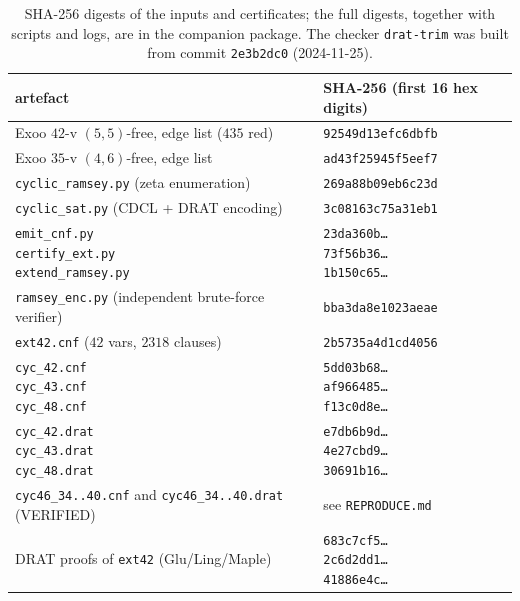 \documentclass[11pt]{article}
\theoremstyle{definition}
\theoremstyle{plain}
\begin{document}
\begin{table}[ht]
\centering\small
\begin{tabular}{ll}
\toprule
artefact & SHA-256 (first 16 hex digits) \\
\midrule
Exoo $42$-v $(5,5)$-free, edge list ($435$ red) & \texttt{92549d13efc6dbfb} \\
Exoo $35$-v $(4,6)$-free, edge list & \texttt{ad43f25945f5eef7} \\
\texttt{cyclic\_ramsey.py} (zeta enumeration) & \texttt{269a88b09eb6c23d} \\
\texttt{cyclic\_sat.py} (CDCL + DRAT encoding) & \texttt{3c08163c75a31eb1} \\
\makecell[l]{\texttt{emit\_cnf.py} \\ \texttt{certify\_ext.py} \\ \texttt{extend\_ramsey.py}} & \makecell[l]{\texttt{23da360b\ldots} \\ \texttt{73f56b36\ldots} \\ \texttt{1b150c65\ldots}} \\
\texttt{ramsey\_enc.py} (independent brute-force verifier) & \texttt{bba3da8e1023aeae} \\
\texttt{ext42.cnf} ($42$ vars, $2318$ clauses) & \texttt{2b5735a4d1cd4056} \\
\makecell[l]{\texttt{cyc\_42.cnf} \\ \texttt{cyc\_43.cnf} \\ \texttt{cyc\_48.cnf}} & \makecell[l]{\texttt{5dd03b68\ldots} \\ \texttt{af966485\ldots} \\ \texttt{f13c0d8e\ldots}} \\
\makecell[l]{\texttt{cyc\_42.drat} \\ \texttt{cyc\_43.drat} \\ \texttt{cyc\_48.drat}} & \makecell[l]{\texttt{e7db6b9d\ldots} \\ \texttt{4e27cbd9\ldots} \\ \texttt{30691b16\ldots}} \\
\texttt{cyc46\_34..40.cnf} and \texttt{cyc46\_34..40.drat} (VERIFIED) & see \texttt{REPRODUCE.md} \\
DRAT proofs of \texttt{ext42} (Glu/Ling/Maple) & \makecell[l]{\texttt{683c7cf5\ldots} \\ \texttt{2c6d2dd1\ldots} \\ \texttt{41886e4c\ldots}} \\
\bottomrule
\end{tabular}
\caption{SHA-256 digests of the inputs and certificates; the full digests,
together with scripts and logs, are in the companion package. The checker
\texttt{drat-trim} was built from commit \texttt{2e3b2dc0} (2024-11-25).}
\label{tab:hashes}
\end{table}
\end{document}
